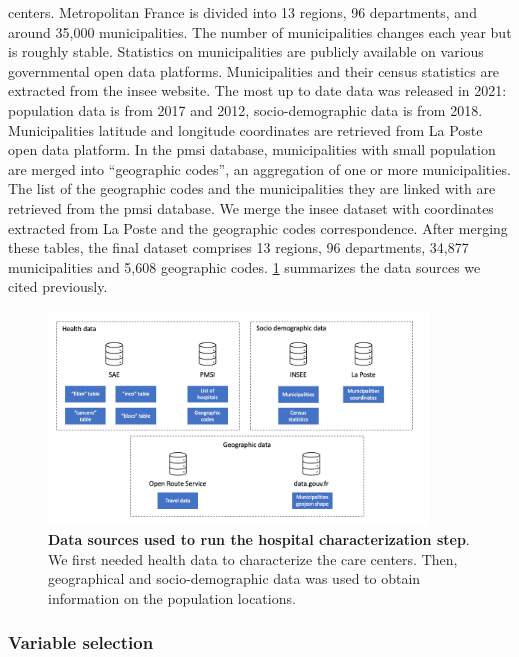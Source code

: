 centers. Metropolitan France is divided into 13 regions, 96 departments, and
around 35,000 municipalities. The number of municipalities changes each year but
is roughly stable. Statistics on municipalities are publicly available on
various governmental open data platforms. Municipalities and their census
statistics are extracted from the \ac{insee} website. The most up to date data
was released in 2021: population data is from 2017 and 2012, socio-demographic
data is from 2018. Municipalities latitude and longitude coordinates are
retrieved from La Poste open data platform. In the \ac{pmsi} database,
municipalities with small population are merged into ``geographic codes'', an
aggregation of one or more municipalities. The list of the geographic codes and
the municipalities they are linked with are retrieved from the \ac{pmsi}
database. We merge the \ac{insee} dataset with coordinates
extracted from La Poste and the geographic codes correspondence. After merging
these tables, the final dataset comprises 13 regions, 96 departments, 34,877
municipalities and 5,608 geographic codes. \cref{fig:data-sources} summarizes
the data sources we cited previously.

\begin{figure}[h]
    \includegraphics[width=0.9\textwidth]{images/camion/databases.png}
    \centering
    \caption{ \textbf{Data sources used to run the hospital characterization
            step}. We first needed health data to characterize the care centers. Then,
        geographical and socio-demographic data was used to obtain information on the
        population locations. }
    \label{fig:data-sources}
\end{figure}

\subsubsection{Variable selection}

